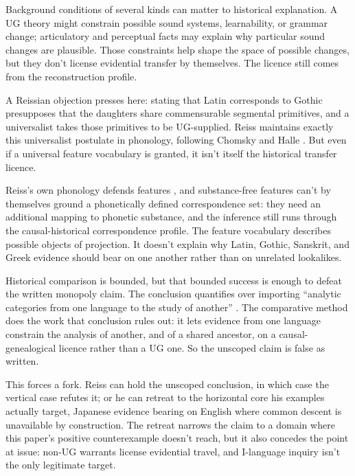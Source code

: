\documentclass[12pt]{article}
\begin{document}
Background conditions of several kinds can matter to historical explanation. A UG theory might constrain possible sound systems, learnability, or grammar change; articulatory and perceptual facts may explain why particular sound changes are plausible. Those constraints help shape the space of possible changes, but they don't license evidential transfer by themselves. The licence still comes from the reconstruction profile.

A Reissian objection presses here: stating that Latin  corresponds to Gothic  presupposes that the daughters share commensurable segmental primitives, and a universalist takes those primitives to be UG-supplied. Reiss maintains exactly this universalist postulate in phonology, following Chomsky and Halle \citep{reiss2026armchair}. But even if a universal feature vocabulary is granted, it isn't itself the historical transfer licence.

Reiss's own phonology defends  features \citep{ReissVolenec2022}, and substance-free features can't by themselves ground a phonetically defined correspondence set: they need an additional mapping to phonetic substance, and the inference still runs through the causal-historical correspondence profile. The feature vocabulary describes possible objects of projection. It doesn't explain why Latin, Gothic, Sanskrit, and Greek evidence should bear on one another rather than on unrelated lookalikes.

Historical comparison is bounded, but that bounded success is enough to defeat the written monopoly claim. The conclusion quantifies over  importing \enquote{analytic categories from one language to the study of another} \citep[sec.~6]{reiss2026armchair}. The comparative method does the work that conclusion rules out: it lets evidence from one language constrain the analysis of another, and of a shared ancestor, on a causal-genealogical licence rather than a UG one. So the unscoped claim is false as written.

This forces a fork. Reiss can hold the unscoped conclusion, in which case the vertical case refutes it; or he can retreat to the horizontal core his examples actually target, Japanese evidence bearing on English where common descent is unavailable by construction. The retreat narrows the claim to a domain where this paper's positive counterexample doesn't reach, but it also concedes the point at issue: non-UG warrants license evidential travel, and I-language inquiry isn't the only legitimate target.
\end{document}
